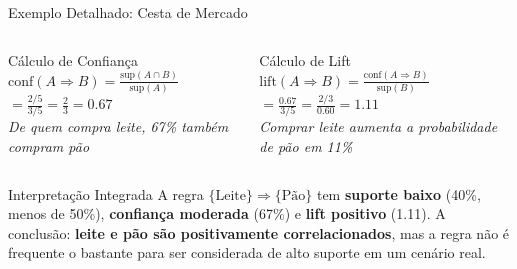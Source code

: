 \documentclass[aspectratio=169]{beamer}
\begin{document}
\begin{frame}[shrink=3]{Exemplo Detalhado: Cesta de Mercado}
\begin{columns}
\begin{block}{Cálculo de Confiança}
            \footnotesize
            $\text{conf}(A \Rightarrow B) = \frac{\text{sup}(A \cap B)}{\text{sup}(A)}$\\[6pt]
            $= \frac{2/5}{3/5} = \frac{2}{3} = \boxed{0{.}67}$\\[6pt]
            \textit{De quem compra leite, 67\% também compram pão}
        \end{block}
        \pause
        \begin{block}{Cálculo de Lift}
            \footnotesize
            $\text{lift}(A \Rightarrow B) = \frac{\text{conf}(A \Rightarrow B)}{\text{sup}(B)}$\\[6pt]
            $= \frac{0{.}67}{3/5} = \frac{2/3}{0{.}60} = \boxed{1{.}11}$\\[6pt]
            \textit{Comprar leite aumenta a probabilidade de pão em 11\%}
        \end{block}
    \end{columns}
    \pause
    \begin{alertblock}{Interpretação Integrada}
        \footnotesize
        A regra $\{\text{Leite}\} \Rightarrow \{\text{Pão}\}$ tem \textbf{suporte baixo} (40\%, menos de 50\%), \textbf{confiança moderada} (67\%) e \textbf{lift positivo} (1.11).
        A conclusão: \textbf{leite e pão são positivamente correlacionados}, mas a regra não é frequente o bastante para ser considerada de alto suporte em um cenário real.
    \end{alertblock}
\end{frame}

\end{document}
